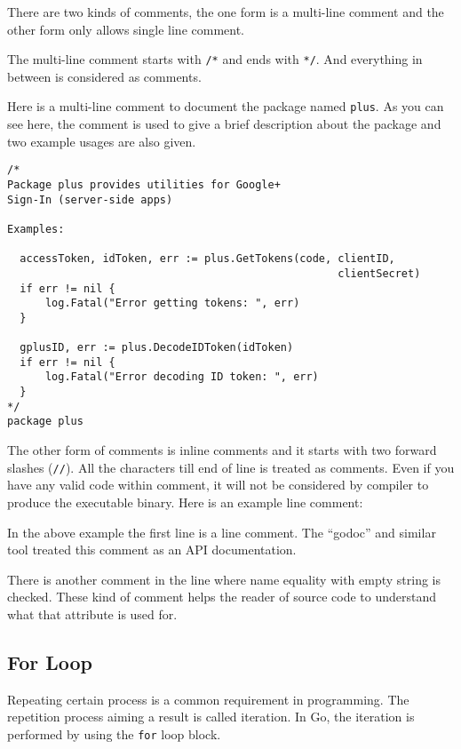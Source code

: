 There are two kinds of comments, the one form is a multi-line comment
and the other form only allows single line comment.

The multi-line comment starts with \texttt{/*} and ends
with \texttt{*/}.  And everything in between is considered as
comments.

Here is a multi-line comment to document the package
named \texttt{plus}.  As you can see here, the comment is used to give
a brief description about the package and two example usages are also
given.

\begin{lstlisting}
/*
Package plus provides utilities for Google+
Sign-In (server-side apps)

Examples:

  accessToken, idToken, err := plus.GetTokens(code, clientID,
                                                    clientSecret)
  if err != nil {
      log.Fatal("Error getting tokens: ", err)
  }

  gplusID, err := plus.DecodeIDToken(idToken)
  if err != nil {
      log.Fatal("Error decoding ID token: ", err)
  }
*/
package plus
\end{lstlisting}

The other form of comments is inline comments and it starts with two
forward slashes (\texttt{//}).  All the characters till end of line is
treated as comments.  Even if you have any valid code within comment,
it will not be considered by compiler to produce the executable
binary.  Here is an example line comment:



In the above example the first line is a line comment.  The ``godoc''
and similar tool treated this comment as an API documentation.

There is another comment in the line where name equality with empty
string is checked.  These kind of comment helps the reader of
source code to understand what that attribute is used for.

\subsection{For Loop}

Repeating certain process is a common requirement in programming.  The
repetition process aiming a result is called iteration.  In Go, the
iteration is performed by using the \texttt{for} loop
block.

